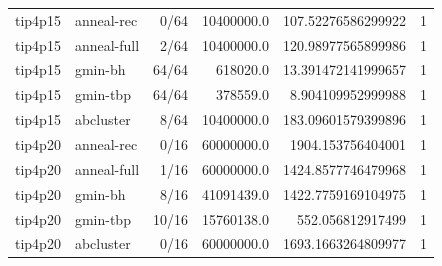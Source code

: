 \begin{longtable}{llrrrr}
tip4p15 & anneal-rec & 0/64 & 10400000.0 & 107.52276586299922 & 1\\
tip4p15 & anneal-full & 2/64 & 10400000.0 & 120.98977565899986 & 1\\
tip4p15 & gmin-bh & 64/64 & 618020.0 & 13.391472141999657 & 1\\
tip4p15 & gmin-tbp & 64/64 & 378559.0 & 8.904109952999988 & 1\\
tip4p15 & abcluster & 8/64 & 10400000.0 & 183.09601579399896 & 1\\
tip4p20 & anneal-rec & 0/16 & 60000000.0 & 1904.153756404001 & 1\\
tip4p20 & anneal-full & 1/16 & 60000000.0 & 1424.8577746479968 & 1\\
tip4p20 & gmin-bh & 8/16 & 41091439.0 & 1422.7759169104975 & 1\\
tip4p20 & gmin-tbp & 10/16 & 15760138.0 & 552.056812917499 & 1\\
tip4p20 & abcluster & 0/16 & 60000000.0 & 1693.1663264809977 & 1\\
\end{longtable}
